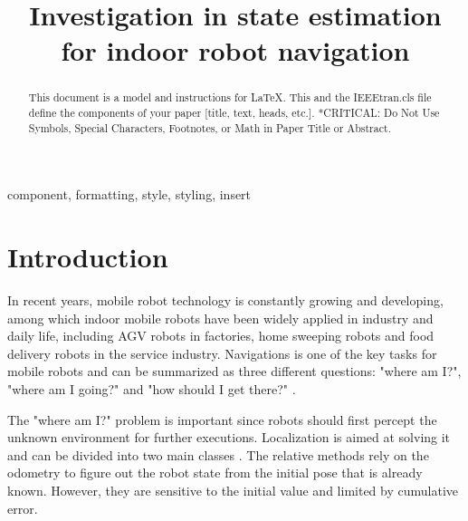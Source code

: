 \documentclass[conference]{IEEEtran}
\begin{document}
	
	\title{Investigation in state estimation for indoor robot navigation\\
	}
	
	\author{
	}
	
	\maketitle
	
	\begin{abstract}
		This document is a model and instructions for \LaTeX.
		This and the IEEEtran.cls file define the components of your paper [title, text, heads, etc.]. *CRITICAL: Do Not Use Symbols, Special Characters, Footnotes, 
		or Math in Paper Title or Abstract.
	\end{abstract}
	
	\begin{IEEEkeywords}
		component, formatting, style, styling, insert
	\end{IEEEkeywords}
	
	\section{Introduction}
	
	In recent years, mobile robot technology is constantly growing and developing, among which indoor mobile robots have been widely applied in industry and daily life, including AGV robots in factories, home sweeping robots and food delivery robots in the service industry. Navigations is one of the key tasks for mobile robots and can be summarized as three different questions: "where am I?", "where am I going?" and "how should I get there?" \cite{leonard1991mobile}. 
	
	The "where am I?" problem is important since robots should first percept the unknown environment for further executions. Localization is aimed at solving it and can be divided into two main classes \cite{borenstein1997mobile}. The relative methods \cite{ahmed2005sharp} \cite{wang2022relative} rely on the odometry to figure out the robot state from the initial pose that is already known. However, they are sensitive to the initial value and limited by cumulative error. 
	
\end{document}
